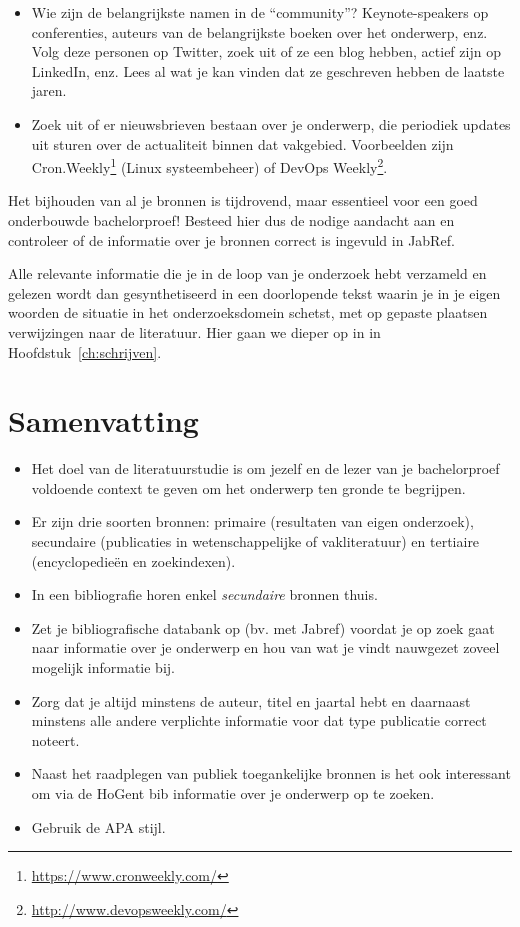 \begin{itemize}
  \item Wie zijn de belangrijkste namen in de ``community''? Keynote-speakers op conferenties, auteurs van de belangrijkste boeken over het onderwerp, enz. Volg deze personen op Twitter, zoek uit of ze een blog hebben, actief zijn op LinkedIn, enz. Lees al wat je kan vinden dat ze geschreven hebben de laatste jaren.
  
  \item Zoek uit of er nieuwsbrieven bestaan over je onderwerp, die periodiek updates uit sturen over de actualiteit binnen dat vakgebied. Voorbeelden zijn Cron.Weekly\footnote{\url{https://www.cronweekly.com/}} (Linux systeembeheer) of DevOps Weekly\footnote{\url{http://www.devopsweekly.com/}}.
\end{itemize}

Het bijhouden van al je bronnen is tijdrovend, maar essentieel voor een goed onderbouwde bachelorproef! Besteed hier dus de nodige aandacht aan en controleer of de informatie over je bronnen correct is ingevuld in JabRef.

Alle relevante informatie die je in de loop van je onderzoek hebt verzameld en gelezen wordt dan gesynthetiseerd in een doorlopende tekst waarin je in je eigen woorden de situatie in het onderzoeksdomein schetst, met op gepaste plaatsen verwijzingen naar de literatuur. Hier gaan we dieper op in in Hoofdstuk~\ref{ch:schrijven}.

\section{Samenvatting}
\label{sec:literatuuronderzoek_samenvatting}

\begin{itemize}
  \item Het doel van de literatuurstudie is om jezelf en de lezer van je bachelorproef voldoende context te geven om het onderwerp ten gronde te begrijpen.
  \item Er zijn drie soorten bronnen: primaire (resultaten van eigen onderzoek), secundaire (publicaties in wetenschappelijke of vakliteratuur) en tertiaire (encyclopedieën en zoekindexen).
  \item In een bibliografie horen enkel \emph{secundaire} bronnen thuis.
  \item Zet je bibliografische databank op (bv. met Jabref) voordat je op zoek gaat naar informatie over je onderwerp en hou van wat je vindt nauwgezet zoveel mogelijk informatie bij.
  \item Zorg dat je altijd minstens de auteur, titel en jaartal hebt en daarnaast minstens alle andere verplichte informatie voor dat type publicatie correct noteert.
  \item Naast het raadplegen van publiek toegankelijke bronnen is het ook interessant om via de HoGent bib informatie over je onderwerp op te zoeken.
  \item Gebruik de APA stijl.
\end{itemize}


